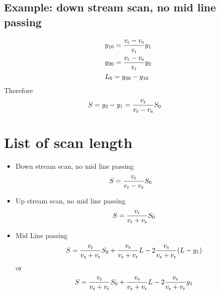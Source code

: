 \documentclass[paper=letter, fontsize=11pt]{scrartcl} %
\begin{document}
\subsection{Example: down stream scan, no mid line passing}
\begin{align}
  \label{eq:1}
  & y_{10} = \frac{v_\mathrm{r}-v_\mathrm{s}}{v_\mathrm{r}}y_1\\
  & y_{20} = \frac{v_\mathrm{r}-v_\mathrm{s}}{v_\mathrm{r}}y_2\\
  &L_0 = y_{20} - y_{10}
\end{align}
Therefore
\begin{align}
  \label{eq:2}
  & S = y_2 - y_1 = \frac{v_\mathrm{r}}{v_\mathrm{r}-v_\mathrm{s}}S_0
\end{align}
\section{List of scan length}
\begin{itemize}
\item Down stream scan, no mid line passing
  \begin{align*}
    & S = \frac{v_\mathrm{r}}{v_\mathrm{r}-v_\mathrm{s}}S_0
  \end{align*}
\item Up stream scan, no mid line passing
  \begin{equation*}
    S = \frac{v_\mathrm{r}}{v_\mathrm{r}+v_\mathrm{s}}S_0
  \end{equation*}
\item Mid Line passing
  \begin{equation*}
    S = \frac{v_\mathrm{r}}{v_\mathrm{s}+v_\mathrm{r}}S_0 + \frac{v_\mathrm{s}}{v_\mathrm{s}+v_\mathrm{r}}L - 2\frac{v_\mathrm{s}}{v_\mathrm{s}+v_\mathrm{r}}(L-y_1)
  \end{equation*}
  or
    \begin{equation*}
    S = \frac{v_\mathrm{r}}{v_\mathrm{s}+v_\mathrm{r}}S_0 + \frac{v_\mathrm{s}}{v_\mathrm{s}+v_\mathrm{r}}L - 2\frac{v_\mathrm{s}}{v_\mathrm{s}+v_\mathrm{r}}y_1
  \end{equation*}
\end{itemize}
\end{document}
